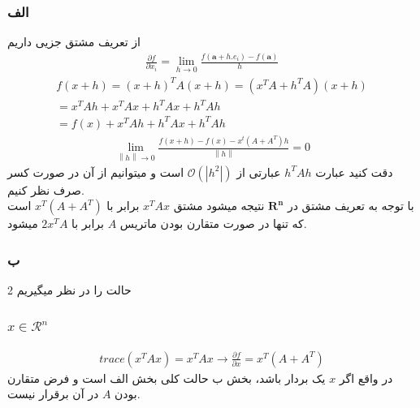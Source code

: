 \documentclass[12pt,onecolumn,a4paper]{article}
\newcommand{\norm}[1]{\left\lVert#1\right\rVert}
\begin{document}
	\subsubsection*{الف}
	از تعریف مشتق جزیی داریم
	\begin{align*}
		\frac{\partial f}{\partial x_i} = \lim_{h \to 0} \frac{f(\mathbf{a} + h.e_i) - f(\mathbf{a})}{h}
	\end{align*}
	\begin{align*}
		f(x + h) = (x+h)^T A (x+h) = (x^TA + h^T A)(x + h) \\= x^T A h + x^T A x + h^T A x + h^T A h \\ = f(x) + x^T A h + h^T A x + h^T A h
	\end{align*}
	\begin{align*}
		\lim_{\norm{h} \to 0} \frac{f(x + h) - f(x) - x^t(A + A^T)h}{\norm{h}} = 0
	\end{align*}
دقت کنید عبارت 
$h^TAh$
عبارتی از 
$\mathcal{O}(|h^2|)$
است و میتوانیم از آن در صورت کسر صرف نظر کنیم.
\\
با توجه به تعریف مشتق در 
$\mathbf{R^n}$
نتیجه میشود مشتق 
$x^T A x$
برابر با 
$x^T (A + A^T)$
است که تنها در صورت متقارن بودن ماتریس 
$A$
برابر با
$2x^TA$
میشود. 
	\subsubsection*{ب}
	2 حالت را در نظر میگیریم
	\subsubsection*{$x \in  \mathcal{R}^n$}
	\begin{align*}
		trace(x^T A x) = x^T A x \rightarrow \frac{\partial f}{\partial x} = x^T (A + A^T)
	\end{align*}
در واقع اگر 
$x$
یک بردار باشد، بخش ب حالت کلی بخش الف است و فرض متقارن بودن 
$A$
در آن برقرار نیست.
\end{document}
